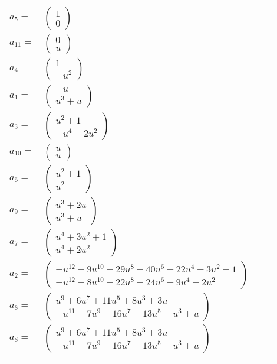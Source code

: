 \documentclass[1p]{elsarticle_modified}
\theoremstyle{definition}
\begin{document}
\begin{tabular}{m{7pt} m{180pt} m{7pt} m{180pt} }
\flushright $a_{5}=$&$\begin{pmatrix}1\\0\end{pmatrix}$ \\
\flushright $a_{11}=$&$\begin{pmatrix}0\\u\end{pmatrix}$ \\
\flushright $a_{4}=$&$\begin{pmatrix}1\\- u^2\end{pmatrix}$ \\
\flushright $a_{1}=$&$\begin{pmatrix}- u\\u^3+u\end{pmatrix}$ \\
\flushright $a_{3}=$&$\begin{pmatrix}u^2+1\\- u^4-2 u^2\end{pmatrix}$ \\
\flushright $a_{10}=$&$\begin{pmatrix}u\\u\end{pmatrix}$ \\
\flushright $a_{6}=$&$\begin{pmatrix}u^2+1\\u^2\end{pmatrix}$ \\
\flushright $a_{9}=$&$\begin{pmatrix}u^3+2 u\\u^3+u\end{pmatrix}$ \\
\flushright $a_{7}=$&$\begin{pmatrix}u^4+3 u^2+1\\u^4+2 u^2\end{pmatrix}$ \\
\flushright $a_{2}=$&$\begin{pmatrix}- u^{12}-9 u^{10}-29 u^8-40 u^6-22 u^4-3 u^2+1\\- u^{12}-8 u^{10}-22 u^8-24 u^6-9 u^4-2 u^2\end{pmatrix}$ \\
\flushright $a_{8}=$&$\begin{pmatrix}u^9+6 u^7+11 u^5+8 u^3+3 u\\- u^{11}-7 u^9-16 u^7-13 u^5- u^3+u\end{pmatrix}$\\ \flushright $a_{8}=$&$\begin{pmatrix}u^9+6 u^7+11 u^5+8 u^3+3 u\\- u^{11}-7 u^9-16 u^7-13 u^5- u^3+u\end{pmatrix}$\\&\end{tabular}
\end{document}
